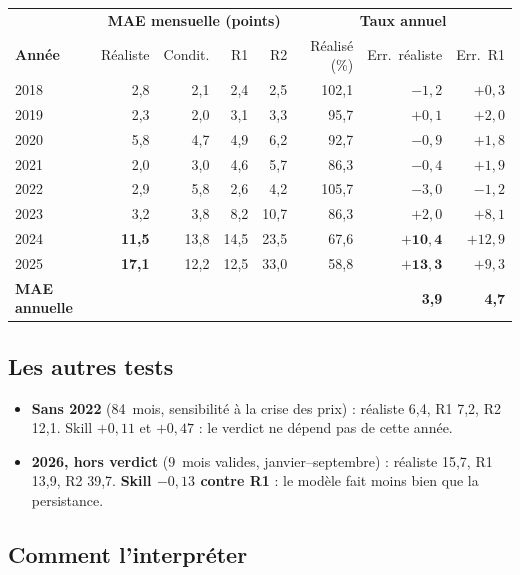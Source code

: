 \documentclass[11pt,a4paper]{article}
\begin{document}
\begin{center}
\begin{tabular}{lrrrr|rrr}
\toprule
 & \multicolumn{4}{c|}{\textbf{MAE mensuelle (points)}} & \multicolumn{3}{c}{\textbf{Taux annuel}} \\
\textbf{Année} & Réaliste & Condit. & R1 & R2 & Réalisé (\%) & Err.\ réaliste & Err.\ R1 \\
\midrule
2018 & 2,8 & 2,1 & 2,4 & 2,5 & 102,1 & $-1{,}2$ & $+0{,}3$ \\
2019 & 2,3 & 2,0 & 3,1 & 3,3 & 95,7 & $+0{,}1$ & $+2{,}0$ \\
2020 & 5,8 & 4,7 & 4,9 & 6,2 & 92,7 & $-0{,}9$ & $+1{,}8$ \\
2021 & 2,0 & 3,0 & 4,6 & 5,7 & 86,3 & $-0{,}4$ & $+1{,}9$ \\
2022 & 2,9 & 5,8 & 2,6 & 4,2 & 105,7 & $-3{,}0$ & $-1{,}2$ \\
2023 & 3,2 & 3,8 & 8,2 & 10,7 & 86,3 & $+2{,}0$ & $+8{,}1$ \\
2024 & \textbf{11,5} & 13,8 & 14,5 & 23,5 & 67,6 & $\mathbf{+10{,}4}$ & $+12{,}9$ \\
2025 & \textbf{17,1} & 12,2 & 12,5 & 33,0 & 58,8 & $\mathbf{+13{,}3}$ & $+9{,}3$ \\
\midrule
\textbf{MAE annuelle} & & & & & & \textbf{3,9} & \textbf{4,7} \\
\bottomrule
\end{tabular}
\end{center}

\subsection{Les autres tests}

\begin{itemize}
\item \textbf{Sans 2022} (84~mois, sensibilité à la crise des prix) : réaliste 6,4, R1 7,2, R2 12,1. Skill $+0{,}11$ et $+0{,}47$ : le verdict ne dépend pas de cette année.
\item \textbf{2026, hors verdict} (9~mois valides, janvier--septembre) : réaliste 15,7, R1 13,9, R2 39,7. \textbf{Skill $-0{,}13$ contre R1} : le modèle fait moins bien que la persistance.
\end{itemize}

\subsection{Comment l'interpréter}
\end{document}

